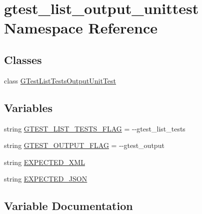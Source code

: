 \hypertarget{namespacegtest__list__output__unittest}{}\section{gtest\+\_\+list\+\_\+output\+\_\+unittest Namespace Reference}
\label{namespacegtest__list__output__unittest}
\subsection*{Classes}
\begin{DoxyCompactItemize}
\item 
class \mbox{\hyperlink{classgtest__list__output__unittest_1_1_g_test_list_tests_output_unit_test}{G\+Test\+List\+Tests\+Output\+Unit\+Test}}
\end{DoxyCompactItemize}
\subsection*{Variables}
\begin{DoxyCompactItemize}
\item 
string \mbox{\hyperlink{namespacegtest__list__output__unittest_a37b4604332427bf1e439809e5b116cb5}{G\+T\+E\+S\+T\+\_\+\+L\+I\+S\+T\+\_\+\+T\+E\+S\+T\+S\+\_\+\+F\+L\+AG}} = \textquotesingle{}-\/-\/gtest\+\_\+list\+\_\+tests\textquotesingle{}
\item 
string \mbox{\hyperlink{namespacegtest__list__output__unittest_a3124ac294a9b2dd4fc504bf7d98b39a0}{G\+T\+E\+S\+T\+\_\+\+O\+U\+T\+P\+U\+T\+\_\+\+F\+L\+AG}} = \textquotesingle{}-\/-\/gtest\+\_\+output\textquotesingle{}
\item 
string \mbox{\hyperlink{namespacegtest__list__output__unittest_a8e3429fbd5f2ccb15d77af07b212c355}{E\+X\+P\+E\+C\+T\+E\+D\+\_\+\+X\+ML}}
\item 
string \mbox{\hyperlink{namespacegtest__list__output__unittest_ab23ce49d040a6881e33eec438c566c88}{E\+X\+P\+E\+C\+T\+E\+D\+\_\+\+J\+S\+ON}}
\end{DoxyCompactItemize}


\subsection{Variable Documentation}
\mbox{\label{namespacegtest__list__output__unittest_ab23ce49d040a6881e33eec438c566c88}} 
